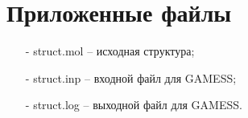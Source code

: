 \section{Приложенные файлы}
\begin{itemize}
    \item[-] struct.mol – исходная структура;
    \item[-] struct.inp – входной файл для GAMESS;
    \item[-] struct.log – выходной файл для GAMESS.
\end{itemize}{}